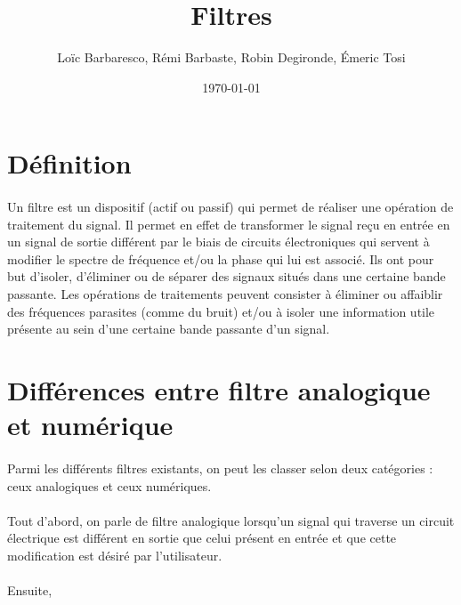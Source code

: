 \documentclass[a4paper,11pt]{article}
\title{Filtres}
\author{Loïc Barbaresco, Rémi Barbaste, Robin Degironde, Émeric Tosi}
\date{\today}
\begin{document}
    \maketitle{}
    \clearpage

    \setcounter{tocdepth}{1} %
    \renewcommand{\contentsname}{Sommaire} %
    \tableofcontents{} %
    \clearpage


\section{Définition}
    \paragraph{}
Un filtre est un dispositif (actif ou passif) qui permet de réaliser une opération de traitement du signal.
Il permet en effet de transformer le signal reçu en entrée en un signal de sortie différent par le biais de circuits électroniques qui servent à modifier le spectre de fréquence et/ou la phase qui lui est associé.
Ils ont pour but d'isoler,  d'éliminer ou de séparer des signaux situés dans une certaine bande passante.
Les opérations de traitements peuvent consister à éliminer ou affaiblir des fréquences parasites (comme du bruit) et/ou à isoler une information utile présente au sein d'une certaine bande passante d'un signal.

    \clearpage

\section{Différences entre filtre analogique et numérique}
    \paragraph{}
Parmi les différents filtres existants, on peut les classer selon deux catégories : ceux analogiques et ceux numériques.
    \paragraph{}
Tout d'abord, on parle de filtre analogique lorsqu'un signal qui traverse un circuit électrique est différent en sortie que celui présent en entrée et que cette modification est désiré par l'utilisateur.
    \paragraph{}
Ensuite,
\end{document}
